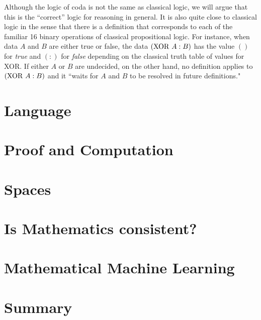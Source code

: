 \documentclass[11pt]{article}
\begin{document}
    Although the logic of coda is not the same as classical logic, we will argue that this is the ``correct'' logic for reasoning in general.  It is also quite close to classical logic in the sense that there is a definition that corresponds to each of the familiar 16 binary operations of classical propositional logic.  For instance, when data $A$ and $B$ are either true or false, the data $({\rm XOR}\ A:B)$ has the value $()$ for {\it true} and $(:)$ for {\it false} depending on the classical truth table of values for XOR.  If either $A$ or $B$ are undecided, on the other hand, no definition applies to $({\rm XOR}\ A:B)$ and it ``waits for $A$ and $B$ to be resolved in future definitions."
    
\section{Language}


\section{Proof and Computation}
\section{Spaces}
\section{Is Mathematics consistent?}
\section{Mathematical Machine Learning}
\section{Summary} 
\end{document}
